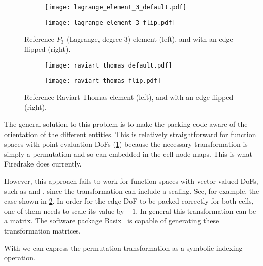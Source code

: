 \documentclass[thesis]{subfiles}
\begin{document}
\begin{figure}
  \centering
  \begin{subfigure}{0.45\textwidth}
    \centering
    \texttt{[image: lagrange\_element\_3\_default.pdf]}
  \end{subfigure}
  \begin{subfigure}{0.45\textwidth}
    \centering
    \texttt{[image: lagrange\_element\_3\_flip.pdf]}
  \end{subfigure}
  \caption{Reference $P_3$ (Lagrange, degree 3) element (left), and with an edge flipped (right).}
  \label{fig:element_orientation_permute}
\end{figure}

\begin{figure}
  \centering
  \begin{subfigure}{0.45\textwidth}
    \centering
    \texttt{[image: raviart\_thomas\_default.pdf]}
  \end{subfigure}
  \begin{subfigure}{0.45\textwidth}
    \centering
    \texttt{[image: raviart\_thomas\_flip.pdf]}
  \end{subfigure}
  \caption{Reference Raviart-Thomas element (left), and with an edge flipped (right).}
  \label{fig:element_orientation_flip}
\end{figure}

The general solution to this problem is to make the packing code aware of the orientation of the different entities.
This is relatively straightforward for function spaces with point evaluation DoFs (\cref{fig:element_orientation_permute}) because the necessary transformation is simply a permutation and so can embedded in the cell-node maps.
This is what Firedrake does currently.

However, this approach fails to work for function spaces with vector-valued DoFs, such as \hdiv and \hcurl, since the transformation can include a scaling.
See, for example, the case shown in \cref{fig:element_orientation_flip}.
In order for the edge DoF to be packed correctly for both cells, one of them needs to scale its value by $-1$.
In general this transformation can be a matrix.
The software package Basix~\cite{scroggsBasixRuntimeFinite2022,scroggsConstructionArbitraryOrder2021} is capable of generating these transformation matrices.

With  we can express the permutation transformation as a symbolic indexing operation.
\end{document}
